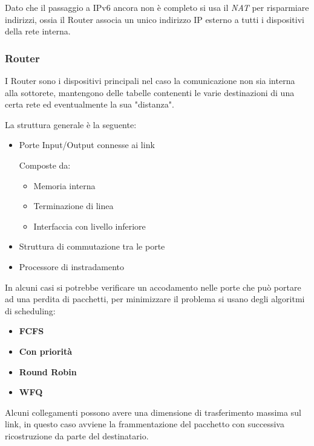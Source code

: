 \documentclass{article}
\begin{document}
\noindent Dato che il passaggio a IPv6 ancora non è completo si usa il \textit{NAT} per risparmiare indirizzi, ossia il Router associa un unico indirizzo IP esterno a tutti i dispositivi della rete interna.\newline 

\subsubsection{Router}

I Router sono i dispositivi principali nel caso la comunicazione non sia interna alla sottorete, mantengono delle tabelle contenenti le varie destinazioni di una certa rete ed eventualmente la sua "distanza".\newline

\noindent La struttura generale è la seguente:
\begin{itemize}
    \item Porte Input/Output connesse ai link

        Composte da:
        \begin{itemize}
            \item Memoria interna
            \item Terminazione di linea
            \item Interfaccia con livello inferiore
        \end{itemize}
        
    \item Struttura di commutazione tra le porte
    \item Processore di instradamento\newline
\end{itemize}

\noindent In alcuni casi si potrebbe verificare un accodamento nelle porte che può portare ad una perdita di pacchetti, per minimizzare il problema si usano degli algoritmi di scheduling:
\begin{itemize}
    \item \textbf{FCFS}
    \item \textbf{Con priorità}
    \item \textbf{Round Robin}
    \item \textbf{WFQ}\newline
\end{itemize}

\noindent Alcuni collegamenti possono avere una dimensione di trasferimento massima sul link, in questo caso avviene la frammentazione del pacchetto con successiva ricostruzione da parte del destinatario.\newline
\end{document}
